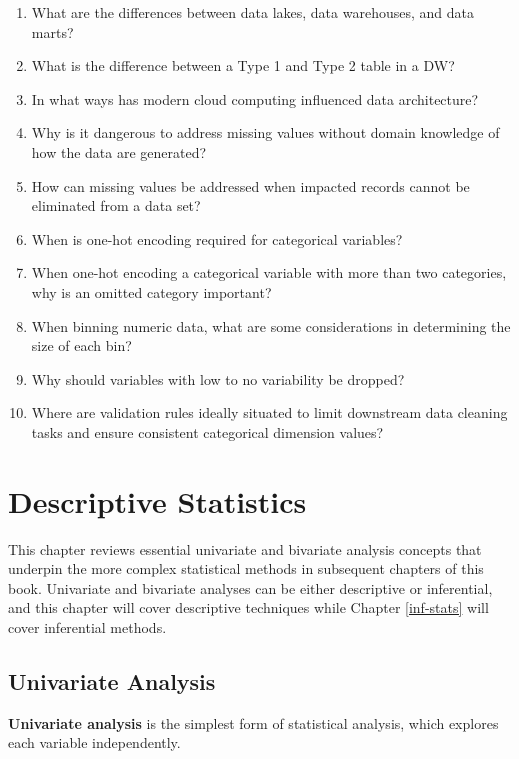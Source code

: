 \documentclass[
]{book}
\begin{document}
\begin{enumerate}
\def\labelenumi{\arabic{enumi}.}
\item
  What are the differences between data lakes, data warehouses, and data marts?
\item
  What is the difference between a Type 1 and Type 2 table in a DW?
\item
  In what ways has modern cloud computing influenced data architecture?
\item
  Why is it dangerous to address missing values without domain knowledge of how the data are generated?
\item
  How can missing values be addressed when impacted records cannot be eliminated from a data set?
\item
  When is one-hot encoding required for categorical variables?
\item
  When one-hot encoding a categorical variable with more than two categories, why is an omitted category important?
\item
  When binning numeric data, what are some considerations in determining the size of each bin?
\item
  Why should variables with low to no variability be dropped?
\item
  Where are validation rules ideally situated to limit downstream data cleaning tasks and ensure consistent categorical dimension values?
\end{enumerate}

\hypertarget{desc-stats}{%
\chapter{Descriptive Statistics}\label{desc-stats}}

This chapter reviews essential univariate and bivariate analysis concepts that underpin the more complex statistical methods in subsequent chapters of this book. Univariate and bivariate analyses can be either descriptive or inferential, and this chapter will cover descriptive techniques while Chapter \ref{inf-stats} will cover inferential methods.

\hypertarget{univariate-analysis}{%
\section{Univariate Analysis}\label{univariate-analysis}}

\textbf{Univariate analysis} is the simplest form of statistical analysis, which explores each variable independently.
\end{document}

